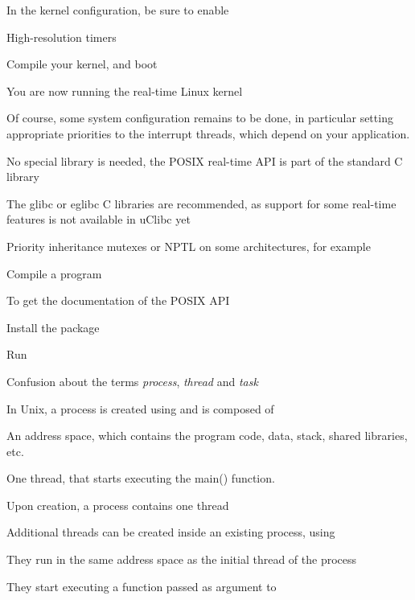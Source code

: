   \startitemize
  \item In the kernel configuration, be sure to enable
    \startitemize
    \item {}
    \item High-resolution timers
    \stopitemize
  \item Compile your kernel, and boot
  \item You are now running the real-time Linux kernel
  \item Of course, some system configuration remains to be done, in
    particular setting appropriate priorities to the interrupt
    threads, which depend on your application.
  \stopitemize


  \startitemize
  \item No special library is needed, the POSIX real-time API is part
    of the standard C library
  \item The glibc or eglibc C libraries are recommended, as support
    for some real-time features is not available in uClibc yet
    \startitemize
    \item Priority inheritance mutexes or NPTL on some architectures,
      for example
    \stopitemize
  \item Compile a program
    \startitemize
    \item {}
    \stopitemize
  \item To get the documentation of the POSIX API
    \startitemize
    \item Install the  package
    \item Run 
    \stopitemize
  \stopitemize

  \startitemize
  \item Confusion about the terms {\em process}, {\em thread} and {\em task}
  \item In Unix, a process is created using  and is composed of
    \startitemize
    \item An address space, which contains the program code, data, stack, shared
      libraries, etc.
    \item One thread, that starts executing the main() function.
    \item Upon creation, a process contains one thread
    \stopitemize
  \item Additional threads can be created inside an existing process, using
    \startitemize
    \item They run in the same address space as the initial thread of
      the process
    \item They start executing a function passed as argument to
    \stopitemize
  \stopitemize


